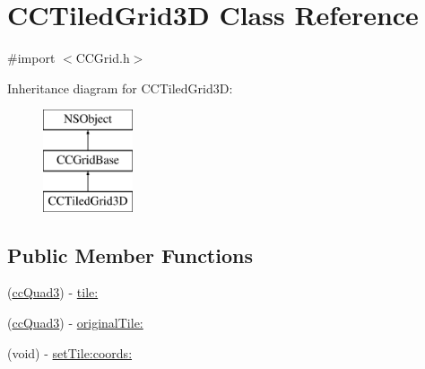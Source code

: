 \hypertarget{interface_c_c_tiled_grid3_d}{\section{C\-C\-Tiled\-Grid3\-D Class Reference}
\label{interface_c_c_tiled_grid3_d}
}


{\ttfamily \#import $<$C\-C\-Grid.\-h$>$}

Inheritance diagram for C\-C\-Tiled\-Grid3\-D\-:\begin{figure}[H]
\begin{center}
\leavevmode
\includegraphics[height=3.000000cm]{interface_c_c_tiled_grid3_d}
\end{center}
\end{figure}
\subsection*{Public Member Functions}
\begin{DoxyCompactItemize}
\item 
(\hyperlink{cc_types_8h_ad1788e6cb4630050d2f69887f812c73d}{cc\-Quad3}) -\/ \hyperlink{interface_c_c_tiled_grid3_d_a5cd1254d733dd4fdbcbd1d3e858d64da}{tile\-:}
\item 
(\hyperlink{cc_types_8h_ad1788e6cb4630050d2f69887f812c73d}{cc\-Quad3}) -\/ \hyperlink{interface_c_c_tiled_grid3_d_ace57204b70f5e31cb25659264d7dd31d}{original\-Tile\-:}
\item 
(void) -\/ \hyperlink{interface_c_c_tiled_grid3_d_afbe9f2e02f6ae5244fdd675a37448d19}{set\-Tile\-:coords\-:}
\end{DoxyCompactItemize}
